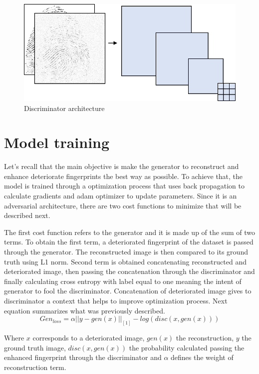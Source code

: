 \documentclass[a4paper,fleqn]{cas-dc}
\begin{document}
\begin{figure}[htbp]
\centerline{\includegraphics[scale=0.4]{figs/discriminator.png}}
\caption{Discriminator architecture}
\label{fig5}
\end{figure}

\section{Model training}
\label{sec:MT}

Let's recall that the main objective is make the generator to reconstruct and enhance deteriorate fingerprints the best way as possible. To achieve that, the model is trained through a optimization process that uses back propagation to calculate gradients and adam optimizer to update parameters. Since it is an adversarial architecture, there are two cost functions to minimize that will be described next.

The first cost function refers to the generator and it is made up of the sum of two terms. To obtain the first term, a deteriorated fingerprint of the dataset is passed through the generator. The reconstructed image is then compared to its ground truth using L1 norm. Second term is obtained concatenating reconstructed and deteriorated image, then passing the concatenation through the discriminator and finally calculating cross entropy with label equal to one meaning the intent of generator to fool the discriminator. Concatenation of deteriorated image gives to discriminator a context that helps to improve optimization process. Next equation summarizes what was previously described.
\begin{equation}
    Gen_{loss} = \alpha||y-gen(x)||_{[1]} - log(disc(x,gen(x)))
\end{equation}

Where $x$ corresponds to a deteriorated image, $gen(x)$ the reconstruction, $y$ the ground truth image, $disc(x,gen(x))$ the probability calculated passing the enhanced fingerprint through the discriminator and $\alpha$ defines the weight of reconstruction term.
\end{document}
